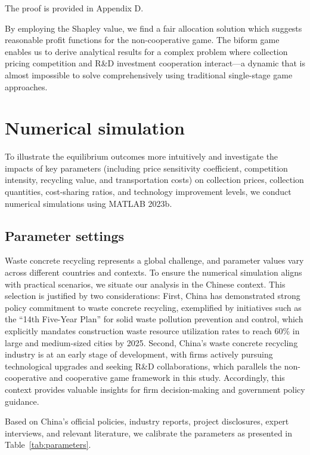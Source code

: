 \documentclass[authoryear,preprint,review,times,10pt]{elsarticle}
\begin{document}
 The proof is provided in Appendix D.

By employing the Shapley value, we find a fair allocation solution which suggests reasonable profit functions for the non-cooperative game. The biform game enables us to derive analytical results for a complex problem where collection pricing competition and R\&D investment cooperation interact—a dynamic that is almost impossible to solve comprehensively using traditional single-stage game approaches.

\section{Numerical simulation}
To illustrate the equilibrium outcomes more intuitively and investigate the impacts of key parameters (including price sensitivity coefficient, competition intensity, recycling value, and transportation costs) on collection prices, collection quantities, cost-sharing ratios, and technology improvement levels, we conduct numerical simulations using MATLAB 2023b.

\subsection{Parameter settings}
Waste concrete recycling represents a global challenge, and parameter values vary across different countries and contexts. To ensure the numerical simulation aligns with practical scenarios, we situate our analysis in the Chinese context. This selection is justified by two considerations: First, China has demonstrated strong policy commitment to waste concrete recycling, exemplified by initiatives such as the ``14th Five-Year Plan'' for solid waste pollution prevention and control, which explicitly mandates construction waste resource utilization rates to reach 60\% in large and medium-sized cities by 2025. Second, China's waste concrete recycling industry is at an early stage of development, with firms actively pursuing technological upgrades and seeking R\&D collaborations, which parallels the non-cooperative and cooperative game framework in this study. Accordingly, this context provides valuable insights for firm decision-making and government policy guidance.

Based on China's official policies, industry reports, project disclosures, expert interviews, and relevant literature, we calibrate the parameters as presented in Table~\ref{tab:parameters}.
\end{document}
